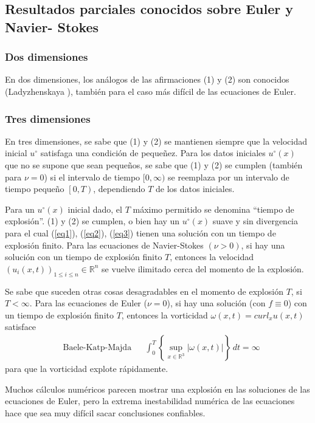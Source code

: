 \subsection{Resultados parciales conocidos sobre Euler y Navier- Stokes}
\subsubsection{Dos dimensiones}
En dos dimensiones, los análogos de las afirmaciones (1) y (2) son conocidos (Ladyzhenskaya \cite{ladyzhenskaya1969mathematical}), también para el caso más difícil de las ecuaciones de Euler. 
\subsubsection{Tres dimensiones}
En tres dimensiones, se sabe que (1) y (2) se mantienen siempre que la velocidad inicial $u^{\circ}$ satisfaga una condición de pequeñez. Para los datos iniciales $u^{\circ}(x)$ que no se supone que sean pequeños, se sabe que (1) y (2) se cumplen (también para $\nu=0$) si el intervalo de tiempo $[0,\infty)$ se reemplaza por un intervalo de tiempo pequeño $\left[0, T\right)$, dependiendo $T$ de los datos iniciales.

Para un $u^{\circ}(x)$ inicial dado, el $T$ máximo permitido se denomina ``tiempo de explosión''. (1) y (2) se cumplen, o bien hay un $u^{\circ}(x)$ suave y sin divergencia para el cual (\ref{eq1}), (\ref{eq2}), (\ref{eq3}) tienen una solución con un tiempo de explosión finito. Para las ecuaciones de Navier-Stokes $(\nu > 0)$, si hay una solución con un tiempo de explosión finito $T$, entonces la velocidad $\left(u_i(x,t)\right)_{1\leq i \leq n}\in \mathbb{R}^n$ se vuelve ilimitado cerca del momento de la explosión.

Se sabe que suceden otras cosas desagradables en el momento de explosión $T$, si $T < \infty$. Para las ecuaciones de Euler ($\nu = 0$), si hay una solución (con $f \equiv  0$) con un tiempo de explosión finito $T$, entonces la vorticidad $\omega(x, t) = curl_x u(x, t)$ satisface
\begin{align}
    &\text{Baele-Katp-Majda}&&\int_0^T \left\{ \sup_{x\in \mathbb{R}^3}\left\lvert \omega(x,t)\right\rvert\right\}\, dt = \infty
\end{align}
para que la vorticidad explote rápidamente.

Muchos cálculos numéricos parecen mostrar una explosión en las soluciones de las ecuaciones de Euler, pero la extrema inestabilidad numérica de las ecuaciones hace que sea muy difícil sacar conclusiones confiables.

